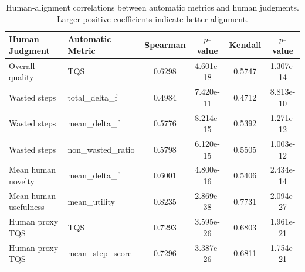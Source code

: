 \begin{table}[t]
\centering
\small
\caption{Human-alignment correlations between automatic metrics and human judgments. Larger positive coefficients indicate better alignment.}
\label{tab:human-alignment-consistency}
\begin{tabular}{llcccc}
\toprule
Human Judgment & Automatic Metric & Spearman & $p$-value & Kendall & $p$-value \\
\midrule
Overall quality & TQS & 0.6298 & 4.601e-18 & 0.5747 & 1.307e-14 \\
\midrule
Wasted steps & total\_delta\_f & 0.4984 & 7.420e-11 & 0.4712 & 8.813e-10 \\
Wasted steps & mean\_delta\_f & 0.5776 & 8.214e-15 & 0.5392 & 1.271e-12 \\
Wasted steps & non\_wasted\_ratio & 0.5798 & 6.120e-15 & 0.5505 & 1.003e-12 \\
\midrule
Mean human novelty & mean\_delta\_f & 0.6001 & 4.800e-16 & 0.5406 & 2.434e-14 \\
Mean human usefulness & mean\_utility & 0.8235 & 2.869e-38 & 0.7731 & 2.094e-27 \\
Human proxy TQS & TQS & 0.7293 & 3.595e-26 & 0.6803 & 1.961e-21 \\
Human proxy TQS & mean\_step\_score & 0.7296 & 3.387e-26 & 0.6811 & 1.754e-21 \\
\bottomrule
\end{tabular}
\end{table}
